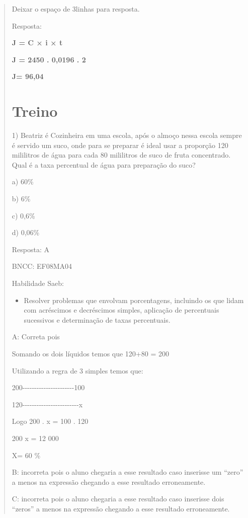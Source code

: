 \begin{quote}
\begin{escolha}
Deixar o espaço de 3linhas para resposta.

Resposta:

\textbf{J = C × i × t}

\textbf{J = 2450 . 0,0196 . 2}

\textbf{J= 96,04}

\section{Treino}

1) Beatriz é Cozinheira em uma escola, após o almoço nessa escola sempre
é servido um suco, onde para se preparar é ideal usar a proporção 120
mililitros de água para cada 80 mililitros de suco de fruta concentrado.
Qual é a taxa percentual de água para preparação do suco?

a) 60\%

b) 6\%

c) 0,6\%

d) 0,06\%

Resposta: A

BNCC: EF08MA04

Habilidade Saeb:

\begin{itemize}
\tightlist
\item
  Resolver problemas que envolvam porcentagens, incluindo os que lidam
  com acréscimos e decréscimos simples, aplicação de percentuais
  sucessivos e determinação de taxas percentuais.
\end{itemize}

A: Correta pois

Somando os dois líquidos temos que 120+80 = 200

Utilizando a regra de 3 simples temos que:

200-\/-\/-\/-\/-\/-\/-\/-\/-\/-\/-\/-\/-\/-\/-\/-\/-\/-\/-\/-\/-\/-100

120-\/-\/-\/-\/-\/-\/-\/-\/-\/-\/-\/-\/-\/-\/-\/-\/-\/-\/-\/-\/-\/-\/-\/-x

Logo 200 . x = 100 . 120

200 x = 12 000

X= 60 \%

B: incorreta pois o aluno chegaria a esse resultado caso inserisse um
``zero'' a menos na expressão chegando a esse resultado erroneamente.

C: incorreta pois o aluno chegaria a esse resultado caso inserisse dois
``zeros'' a menos na expressão chegando a esse resultado erroneamente.


\end{escolha}
\end{quote}
